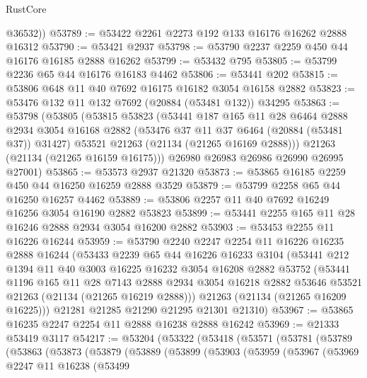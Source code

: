 \begin{lexlean}{RustCore}
\begin{coremodule}
        @36532))
@53789 := @53422 @2261 @2273 @192 @133 @16176 @16262 @2888 @16312
@53790 := @53421 @2937
@53798 := @53790 @2237 @2259 @450 @44 @16176 @16185 @2888 @16262
@53799 := @53432 @795
@53805 := @53799 @2236 @65 @44 @16176 @16183 @4462
@53806 := @53441 @202
@53815 := @53806 @648 @11 @40 @7692 @16175 @16182 @3054 @16158 @2882
@53823 := @53476 @132 @11 @132 @7692 (@20884 (@53481 @132)) @34295
@53863 := @53798
    (@53805
      (@53815
        @53823
        (@53441
          @187
          @165
          @11
          @28
          @6464
          @2888
          @2934
          @3054
          @16168
          @2882
          (@53476 @37 @11 @37 @6464 (@20884 (@53481 @37)) @31427)
          @53521
          @21263
          (@21134 (@21265 @16169 @2888)))
        @21263
        (@21134 (@21265 @16159 @16175)))
      @26980
      @26983
      @26986
      @26990
      @26995
      @27001)
@53865 := @53573 @2937 @21320
@53873 := @53865 @16185 @2259 @450 @44 @16250 @16259 @2888 @3529
@53879 := @53799 @2258 @65 @44 @16250 @16257 @4462
@53889 := @53806 @2257 @11 @40 @7692 @16249 @16256 @3054 @16190 @2882 @53823
@53899 := @53441 @2255 @165 @11 @28 @16246 @2888 @2934 @3054 @16200 @2882
@53903 := @53453 @2255 @11 @16226 @16244
@53959 := @53790
    @2240
    @2247
    @2254
    @11
    @16226
    @16235
    @2888
    @16244
    (@53433
      @2239
      @65
      @44
      @16226
      @16233
      @3104
      (@53441
        @212
        @1394
        @11
        @40
        @3003
        @16225
        @16232
        @3054
        @16208
        @2882
        @53752
        (@53441
          @1196
          @165
          @11
          @28
          @7143
          @2888
          @2934
          @3054
          @16218
          @2882
          @53646
          @53521
          @21263
          (@21134 (@21265 @16219 @2888)))
        @21263
        (@21134 (@21265 @16209 @16225)))
      @21281
      @21285
      @21290
      @21295
      @21301
      @21310)
@53967 := @53865 @16235 @2247 @2254 @11 @2888 @16238 @2888 @16242
@53969 := @21333 @53419 @3117
@54217 := @53204
    (@53322
      (@53418
        (@53571
          (@53781
            (@53789
              (@53863
                (@53873
                  (@53879
                    (@53889
                      (@53899
                        (@53903
                          (@53959
                            (@53967
                              (@53969
                                @2247
                                @11
                                @16238
                                (@53499

\end{coremodule}
\end{lexlean}
